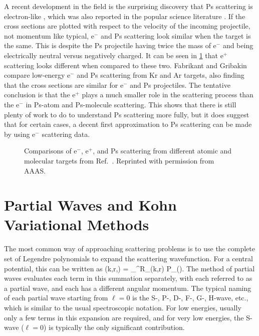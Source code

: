 \documentclass[Dissertation.tex]{subfiles}
\begin{document}
A recent development in the field is the surprising discovery that Ps 
scattering is electron-like \cite{Brawley2010,Brawley2010a}, which was also reported in the
popular science literature \cite{NewScientist2015}. If the cross sections are 
plotted with respect to the velocity of the incoming projectile, not momentum 
like typical, e$^-$ and Ps scattering look similar when the target is the same.
This is despite the Ps projectile having twice the mass of e$^-$ and being 
electrically neutral versus negatively charged. It can be seen in
\cref{fig:ScienceBrawley} that e$^+$ scattering looks different when compared
to these two. Fabrikant and Gribakin
\cite{Fabrikant2014,Fabrikant2014a} compare low-energy e$^-$ and Ps scattering
from Kr and Ar targets, also finding that the cross sections are similar for
e$^-$ and Ps projectiles. The tentative conclusion is that the
e$^+$ plays a much smaller role in the scattering process than the e$^-$
in Ps-atom and Ps-molecule scattering. This shows that there is still
plenty of work to do to understand Ps scattering more fully, but it
does suggest that for certain cases, a decent first approximation to Ps
scattering can be made by using e$^-$ scattering data.

\begin{figure}[H]
	\centering
	\caption[Comparisons of e$^-$, e$^+$, and Ps scattering]{Comparisons of
e$^-$, e$^+$, and Ps scattering from different atomic and molecular targets 
from Ref.~\cite{Brawley2010a}. Reprinted with permission from AAAS.}
	\label{fig:ScienceBrawley}
\end{figure}


\section{Partial Waves and Kohn Variational Methods}
\label{sec:KohnIntro}

The most common way of approaching scattering problems is to use the complete
set of Legendre polynomials to expand the scattering wavefunction. For a
central potential, this can be written as \cite{Bransden2003}
\beq
\label{eq:PartialWave}
\Psi(k,r,\theta) = \sum_{}^\infty R_\ell(k,r) P_\ell(\cos\theta).
\eeq
The method of partial waves evaluates each term in this summation separately,
with each referred to as a partial wave, and each has a different angular 
momentum. The typical naming of each partial wave starting from $\ell = 0$
is the S-, P-, D-, F-, G-, H-wave, etc., which is similar to the usual 
spectroscopic notation. For low energies, usually only a few terms in this
expansion are required, and for very low energies, the S-wave ($\ell = 0$) is 
typically the only significant contribution.
\end{document}
